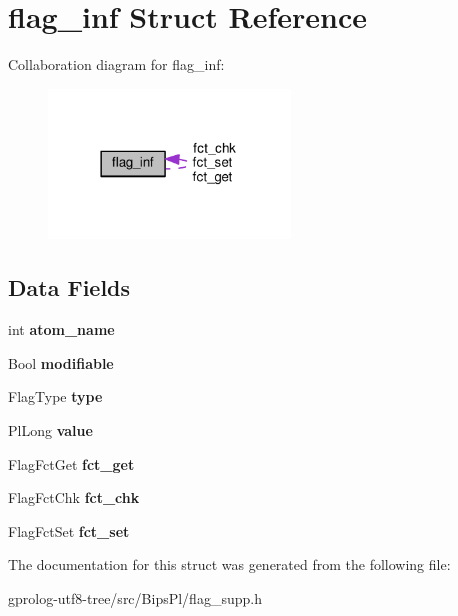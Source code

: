 \hypertarget{structflag__inf}{}\section{flag\+\_\+inf Struct Reference}
\label{structflag__inf}


Collaboration diagram for flag\+\_\+inf\+:\nopagebreak
\begin{figure}[H]
\begin{center}
\leavevmode
\includegraphics[width=182pt]{structflag__inf__coll__graph}
\end{center}
\end{figure}
\subsection*{Data Fields}
\begin{DoxyCompactItemize}
\item 
int {\bfseries atom\+\_\+name}\hypertarget{structflag__inf_a7131c7e545b44d7086d50a89e76bbf30}{}\label{structflag__inf_a7131c7e545b44d7086d50a89e76bbf30}

\item 
Bool {\bfseries modifiable}\hypertarget{structflag__inf_ac95236097fb4811ec47198aa34e64d15}{}\label{structflag__inf_ac95236097fb4811ec47198aa34e64d15}

\item 
Flag\+Type {\bfseries type}\hypertarget{structflag__inf_ad1ffc264915a45e9395b717849c36ff9}{}\label{structflag__inf_ad1ffc264915a45e9395b717849c36ff9}

\item 
Pl\+Long {\bfseries value}\hypertarget{structflag__inf_a828f0d058950ff9e708080d5e96b4068}{}\label{structflag__inf_a828f0d058950ff9e708080d5e96b4068}

\item 
Flag\+Fct\+Get {\bfseries fct\+\_\+get}\hypertarget{structflag__inf_ab4585a2020aa37259cb1117664fecfee}{}\label{structflag__inf_ab4585a2020aa37259cb1117664fecfee}

\item 
Flag\+Fct\+Chk {\bfseries fct\+\_\+chk}\hypertarget{structflag__inf_a46997cf1af90c40fa0e2ecee11b935d7}{}\label{structflag__inf_a46997cf1af90c40fa0e2ecee11b935d7}

\item 
Flag\+Fct\+Set {\bfseries fct\+\_\+set}\hypertarget{structflag__inf_aa01403feaa709ffaa582224b5789b928}{}\label{structflag__inf_aa01403feaa709ffaa582224b5789b928}

\end{DoxyCompactItemize}


The documentation for this struct was generated from the following file\+:\begin{DoxyCompactItemize}
\item 
gprolog-\/utf8-\/tree/src/\+Bips\+Pl/flag\+\_\+supp.\+h\end{DoxyCompactItemize}
